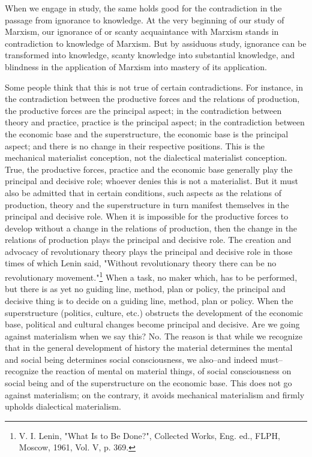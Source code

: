 \documentclass{article}
\begin{document}
When we engage in study, the same holds good for the contradiction in the
passage from ignorance to knowledge. At the very beginning of our study of
Marxism, our ignorance of or scanty acquaintance with Marxism stands in
contradiction to knowledge of Marxism. But by assiduous study, ignorance can be
transformed into knowledge, scanty knowledge into substantial knowledge, and
blindness in the application of Marxism into mastery of its application.

Some people think that this is not true of certain contradictions. For
instance, in the contradiction between the productive forces and the relations
of production, the productive forces are the principal aspect; in the
contradiction between theory and practice, practice is the principal aspect; in
the contradiction between the economic base and the superstructure, the
economic base is the principal aspect; and there is no change in their
respective positions. This is the mechanical materialist conception, not the
dialectical materialist conception. True, the productive forces, practice and
the economic base generally play the principal and decisive role; whoever
denies this is not a materialist. But it must also be admitted that in certain
conditions, such aspects as the relations of production, theory and the
superstructure in turn manifest themselves in the principal and decisive role.
When it is impossible for the productive forces to develop without a change in
the relations of production, then the change in the relations of production
plays the principal and decisive role. The creation and advocacy of
revolutionary theory plays the principal and decisive role in those times of
which Lenin said, "Without revolutionary theory there can be no revolutionary
movement."\footnote{V. I. Lenin, "What Is to Be Done?", Collected Works, Eng.
ed., FLPH, Moscow, 1961, Vol. V, p. 369.} When a task, no maker which, has to
be performed, but there is as yet no guiding line, method, plan or policy, the
principal and decisive thing is to decide on a guiding line, method, plan or
policy. When the superstructure (politics, culture, etc.) obstructs the
development of the economic base, political and cultural changes become
principal and decisive. Are we going against materialism when we say this? No.
The reason is that while we recognize that in the general development of
history the material determines the mental and social being determines social
consciousness, we also--and indeed must--recognize the reaction of mental on
material things, of social consciousness on social being and of the
superstructure on the economic base. This does not go against materialism; on
the contrary, it avoids mechanical materialism and firmly upholds dialectical
materialism.
\end{document}
